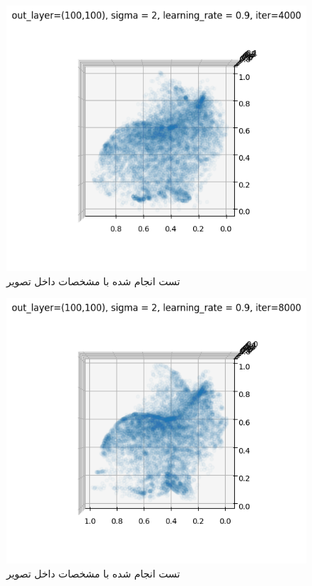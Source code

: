 \documentclass{article}
\begin{document}
\begin{figure}[!h]
    \centering\includegraphics[scale=.65]{./p1-4}
    \caption{تست انجام شده با مشخصات داخل تصویر}\label{fig.14}
\end{figure}

\begin{figure}[!h]
    \centering\includegraphics[scale=.65]{./p1-5}
    \caption{تست انجام شده با مشخصات داخل تصویر}\label{fig.15}
\end{figure}
\end{document}
